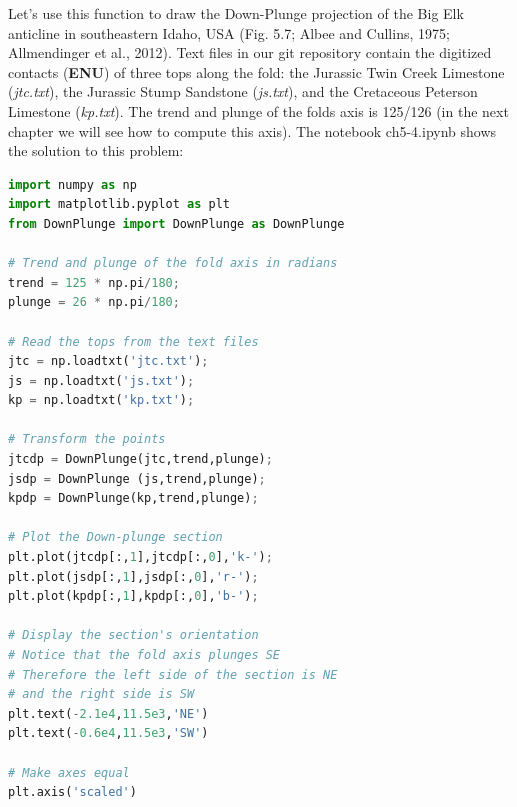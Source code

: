 \documentclass[a4paper , 12pt]{book}
\begin{document}
Let's use this function to draw the Down-Plunge projection of the Big Elk anticline in southeastern Idaho, USA (Fig. 5.7; Albee and Cullins, 1975; Allmendinger et al., 2012). Text files in our git repository contain the digitized contacts (\textbf{ENU}) of three tops along the fold: the Jurassic Twin Creek Limestone (\textit{jtc.txt}), the Jurassic Stump Sandstone (\textit{js.txt}), and the Cretaceous Peterson Limestone (\textit{kp.txt}). The trend and plunge of the folds axis is 125/126 (in the next chapter we will see how to compute this axis). The notebook ch5-4.ipynb shows the solution to this problem:

\begin{center}
\begin{lstlisting}[language=Python, frame=single]
import numpy as np
import matplotlib.pyplot as plt
from DownPlunge import DownPlunge as DownPlunge

# Trend and plunge of the fold axis in radians
trend = 125 * np.pi/180;
plunge = 26 * np.pi/180;

# Read the tops from the text files
jtc = np.loadtxt('jtc.txt');
js = np.loadtxt('js.txt');
kp = np.loadtxt('kp.txt');

# Transform the points
jtcdp = DownPlunge(jtc,trend,plunge);
jsdp = DownPlunge (js,trend,plunge);
kpdp = DownPlunge(kp,trend,plunge);

# Plot the Down-plunge section
plt.plot(jtcdp[:,1],jtcdp[:,0],'k-');
plt.plot(jsdp[:,1],jsdp[:,0],'r-');
plt.plot(kpdp[:,1],kpdp[:,0],'b-');

# Display the section's orientation
# Notice that the fold axis plunges SE
# Therefore the left side of the section is NE
# and the right side is SW
plt.text(-2.1e4,11.5e3,'NE')
plt.text(-0.6e4,11.5e3,'SW')

# Make axes equal
plt.axis('scaled')
\end{lstlisting}
\end{center}
\end{document}
